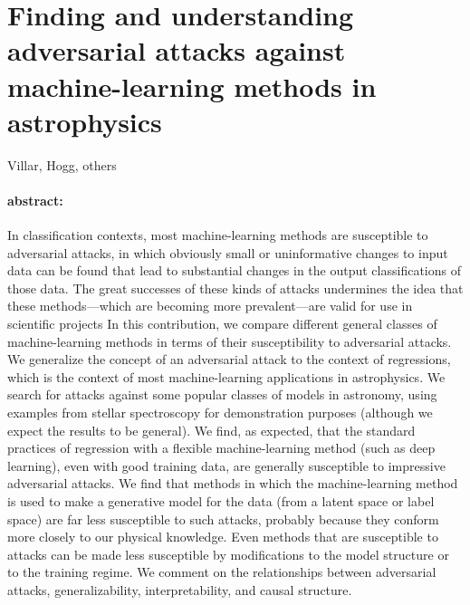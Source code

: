 \documentclass[12pt, letterpaper]{article}
\begin{document}
\section*{Finding and understanding adversarial attacks against machine-learning
          methods in astrophysics}

\noindent
Villar, Hogg, others

\paragraph{abstract:}
In classification contexts, most machine-learning methods are
susceptible to adversarial attacks, in which obviously small or
uninformative changes to input data can be found that lead to substantial
changes in the output classifications of those data.
The great successes of these kinds of attacks undermines the idea that
these methods---which are becoming more prevalent---are valid for use
in scientific projects
In this contribution, we compare different general classes of
machine-learning methods in terms of their susceptibility to
adversarial attacks.
We generalize the concept of an adversarial attack to the context of
regressions, which is the context of most machine-learning
applications in astrophysics.
We search for attacks against some popular classes of models in
astronomy, using examples from stellar spectroscopy for demonstration
purposes (although we expect the results to be general).
We find, as expected, that the standard practices of regression with a
flexible machine-learning method (such as deep learning), even with
good training data, are generally susceptible to impressive
adversarial attacks.
We find that methods in which the machine-learning method is used to
make a generative model for the data (from a latent space or label
space) are far less susceptible to such attacks, probably because they
conform more closely to our physical knowledge.
Even methods that are susceptible to attacks can be made less
susceptible by modifications to the model structure or to the training
regime.
We comment on the relationships between adversarial attacks,
generalizability, interpretability, and causal structure.
\end{document}
